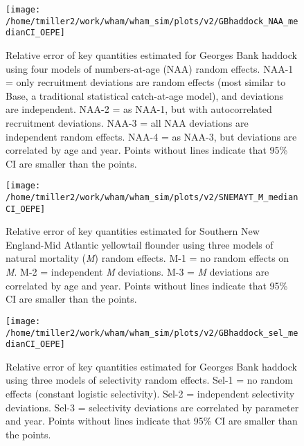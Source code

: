 \documentclass[]{article}
\begin{document}
\pagebreak

\begin{figure}

{\centering \texttt{[image: /home/tmiller2/work/wham/wham\_sim/plots/v2/GBhaddock\_NAA\_medianCI\_OEPE]} 

}

\caption{Relative error of key quantities estimated for Georges Bank haddock using four models of numbers-at-age (NAA) random effects. NAA-1 = only recruitment deviations are random effects (most similar to Base, a traditional statistical catch-at-age model), and deviations are independent. NAA-2 = as NAA-1, but with autocorrelated recruitment deviations. NAA-3 = all NAA deviations are independent random effects. NAA-4 = as NAA-3, but deviations are correlated by age and year. Points without lines indicate that 95\% CI are smaller than the points.}\label{fig:rel-error-GBhaddock-naa}
\end{figure}

\pagebreak

\begin{figure}

{\centering \texttt{[image: /home/tmiller2/work/wham/wham\_sim/plots/v2/SNEMAYT\_M\_medianCI\_OEPE]} 

}

\caption{Relative error of key quantities estimated for Southern New England-Mid Atlantic yellowtail flounder using three models of natural mortality (\textit{M}) random effects. M-1 = no random effects on \textit{M}. M-2 = independent \textit{M} deviations. M-3 = \textit{M} deviations are correlated by age and year. Points without lines indicate that 95\% CI are smaller than the points.}\label{fig:rel-error-snemayt-m}
\end{figure}

\pagebreak

\begin{figure}

{\centering \texttt{[image: /home/tmiller2/work/wham/wham\_sim/plots/v2/GBhaddock\_sel\_medianCI\_OEPE]} 

}

\caption{Relative error of key quantities estimated for Georges Bank haddock using three models of selectivity random effects. Sel-1 = no random effects (constant logistic selectivity). Sel-2 = independent selectivity deviations. Sel-3 = selectivity deviations are correlated by parameter and year. Points without lines indicate that 95\% CI are smaller than the points.}\label{fig:rel-error-GBhaddock-sel}
\end{figure}
\end{document}
